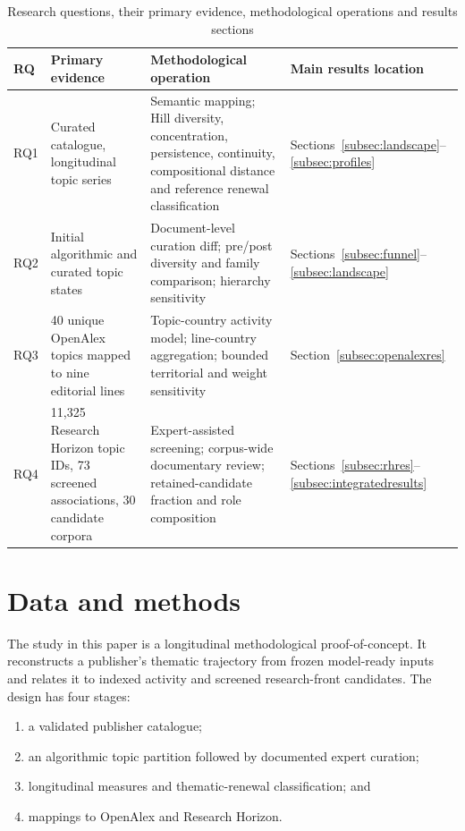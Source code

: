 \documentclass[futureinternet,article,submit,moreauthors]{Definitions/mdpi}
\begin{document}
\begin{table}[htbp]
\caption{Research questions, their primary evidence, methodological operations and results sections}\label{tab:rqs}
\small
\begin{tabularx}{\textwidth}{@{}p{}Y Y Y@{}}
\toprule
RQ & Primary evidence & Methodological operation & Main results location \\
\midrule
RQ1 & Curated catalogue, longitudinal topic series & Semantic mapping; Hill diversity, concentration, persistence, continuity, compositional distance and reference renewal classification & Sections~\ref{subsec:landscape}--\ref{subsec:profiles} \\
RQ2 & Initial algorithmic and curated topic states & Document-level curation diff; pre/post diversity and family comparison; hierarchy sensitivity & Sections~\ref{subsec:funnel}--\ref{subsec:landscape} \\
RQ3 & 40 unique OpenAlex topics mapped to nine editorial lines & Topic-country activity model; line-country aggregation; bounded territorial and weight sensitivity & Section~\ref{subsec:openalexres} \\
RQ4 & 11,325 Research Horizon topic IDs, 73 screened associations, 30 candidate corpora & Expert-assisted screening; corpus-wide documentary review; retained-candidate fraction and role composition & Sections~\ref{subsec:rhres}--\ref{subsec:integratedresults} \\
\bottomrule
\end{tabularx}
\end{table}

\section{Data and methods}\label{sec:methods}


The study in this paper is a longitudinal methodological proof-of-concept. It reconstructs a publisher's thematic trajectory from frozen model-ready inputs and relates it to indexed activity and screened research-front candidates. The design has four stages:
\begin{enumerate}
\item a validated publisher catalogue; 
\item an algorithmic topic partition followed by documented expert curation; 
\item longitudinal measures and thematic-renewal classification; and 
\item mappings to OpenAlex and Research Horizon. 
\end{enumerate}
\end{document}
